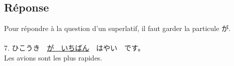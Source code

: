 \documentclass[11pt]{report}
\newenvironment{Japanese}{%
\CJKfamily{min}%
\CJKtilde  
\CJKnospace}{}
\begin{document}
\subsection{Réponse}

\begin{CJK}{UTF8}{}  
\begin{Japanese}
	Pour répondre à la question d'un superlatif, il faut garder la particule が. \\ \\
	7. ひこうき　\underline{が　いちばん}　はやい　です。 \\
	Les avions sont les plus rapides.
	
\end{Japanese}  
\end{CJK}
\end{document}

